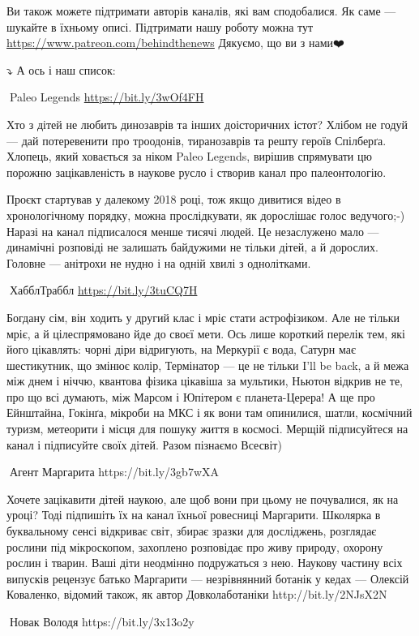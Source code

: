 Ви також можете підтримати авторів каналів, які вам сподобалися. Як саме —
шукайте в їхньому описі. Підтримати нашу роботу можна тут
\url{https://www.patreon.com/behindthenews} Дякуємо, що ви з нами❤️🖤

⤵️ А ось і наш список:

🦉Paleo Legends \url{https://bit.ly/3wOf4FH}

Хто з дітей не любить динозаврів та інших доісторичних істот? Хлібом не годуй — дай потеревенити про троодонів, тиранозаврів та решту героїв Спілберґа. Хлопець, який ховається за ніком Paleo Legends, вирішив спрямувати цю порожню зацікавленість в наукове русло і створив канал про палеонтологію.

Проєкт стартував у далекому 2018 році, тож якщо дивитися відео в хронологічному порядку, можна прослідкувати, як дорослішає голос ведучого;-) Наразі на канал підписалося менше тисячі людей. Це незаслужено мало — динамічні розповіді не залишать байдужими не тільки дітей, а й дорослих. Головне — анітрохи не нудно і на одній хвилі з однолітками.

🦉ХабблТраббл \url{https://bit.ly/3tuCQ7H}

Богдану сім, він ходить у другий клас і мріє стати астрофізиком. Але не тільки мріє, а й цілеспрямовано йде до своєї мети. Ось лише короткий перелік тем, які його цікавлять: чорні діри відригують, на Меркурії є вода, Сатурн має шестикутник, що змінює колір, Термінатор — це не тільки I'll be back, а й межа між днем і ніччю, квантова фізика цікавіша за мультики, Ньютон відкрив не те, про що всі думають, між Марсом і Юпітером є планета-Церера! А ще про Ейнштайна, Гокінґа, мікроби на МКС і як вони там опинилися, шатли, космічний туризм, метеорити і місця для пошуку життя в космосі. Мерщій підписуйтеся на канал і підписуйте своїх дітей. Разом пізнаємо Всесвіт)

🦉Агент Маргарита https://bit.ly/3gb7wXA

Хочете зацікавити дітей наукою, але щоб вони при цьому не почувалися, як на уроці? Тоді підпишіть їх на канал їхньої ровесниці Маргарити. Школярка в буквальному сенсі відкриває світ, збирає зразки для досліджень, розглядає рослини під мікроскопом, захоплено розповідає про живу природу, охорону рослин і тварин. Ваші діти неодмінно подружаться з нею. Наукову частину всіх випусків рецензує батько Маргарити — незрівнянний ботанік у кедах — Олексій Коваленко, відомий також, як автор Довколаботаніки http://bit.ly/2NJsX2N

🦉Новак Володя https://bit.ly/3x13o2y 

